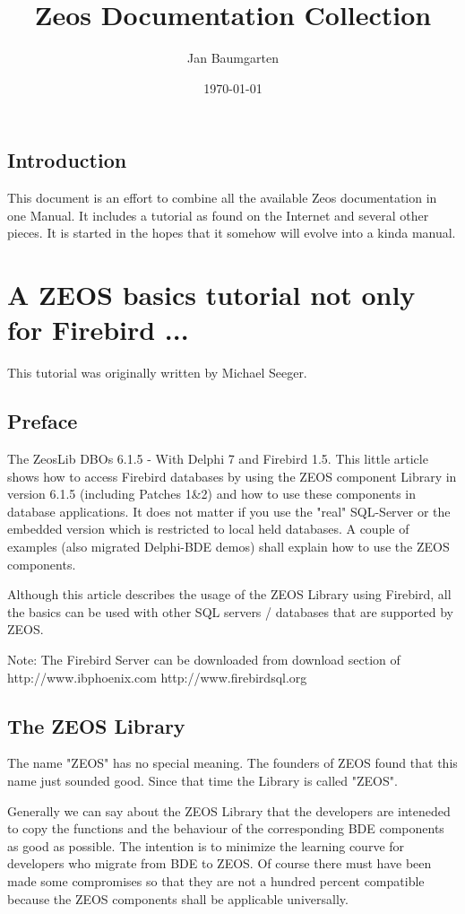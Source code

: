 \documentclass[a4paper,12pt,oneside]{book}
\title{Zeos Documentation Collection}
\author{Jan Baumgarten}
\date{\today}
\begin{document}
\maketitle
\tableofcontents

\chapter{Introduction}
This document is an effort to combine all the available Zeos documentation in one Manual.
It includes a tutorial as found on the Internet and several other pieces.
It is started in the hopes that it somehow will evolve into a kinda manual.

\part{A ZEOS basics tutorial not only for Firebird ...}
This tutorial was originally written by Michael Seeger.

\chapter{Preface}
The ZeosLib DBOs 6.1.5 - With Delphi 7 and Firebird 1.5.
This little article shows how to access Firebird databases by using the ZEOS component Library in version 6.1.5 (including Patches 1\&2) and how to use these components in database applications.
It does not matter if you use the "real" SQL-Server or the embedded version which is restricted to local held databases.
A couple of examples (also migrated Delphi-BDE demos) shall explain how to use the ZEOS
components.

Although this article describes the usage of the ZEOS Library using Firebird, all the basics can be used with other SQL servers / databases that are supported by ZEOS.

Note: The Firebird Server can be downloaded from download section of
http://www.ibphoenix.com
http://www.firebirdsql.org

\chapter{The ZEOS Library}
The name "ZEOS" has no special meaning. The founders of ZEOS found that this name just sounded good.
Since that time the Library is called "ZEOS".

Generally we can say about the ZEOS Library that the developers are inteneded to
copy the functions and the behaviour of the corresponding BDE components as good
as possible.
The intention is to minimize the learning courve for developers who
migrate from BDE to ZEOS.
Of course there must have been made some compromises so that they are not a hundred percent compatible because the ZEOS components shall be applicable universally.
\end{document}
